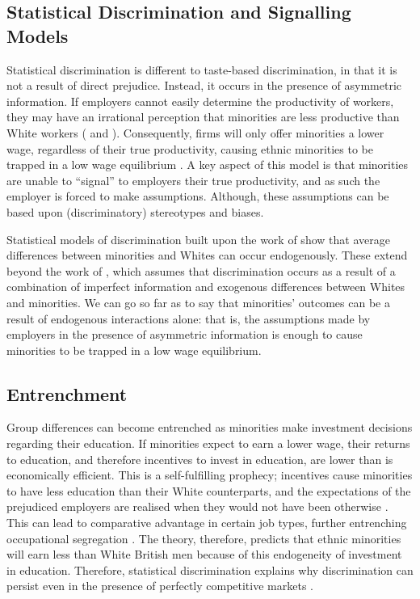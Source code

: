 \documentclass[class=article, crop=false]{standalone}
\begin{document}
\subsection{Statistical Discrimination and Signalling Models}
\label{sec:Stat_discrim and signalling}
Statistical discrimination is different to taste-based discrimination, in that it is not a result of direct prejudice. Instead, it occurs in the presence of asymmetric information. If employers cannot easily determine the productivity of workers, they may have an irrational perception that minorities are less productive than White workers (\citet{Phelps} and \citet{LundbergB}). Consequently, firms will only offer minorities a lower wage, regardless of their true productivity, causing ethnic minorities to be trapped in a low wage equilibrium \citep{Barr}. A key aspect of this model is that minorities are unable to \enquote{signal} to employers their true productivity, and as such the employer is forced to make assumptions. Although, these assumptions can be based upon (discriminatory) stereotypes and biases.

Statistical models of discrimination built upon the work of \citep{Arrow} show that average differences between minorities and Whites can occur endogenously. These extend beyond the work of \citet{Phelps}, which assumes that discrimination occurs as a result of a combination of imperfect information and exogenous differences between Whites and minorities. We can go so far as to say that minorities' outcomes can be a result of endogenous interactions alone: that is, the assumptions made by employers in the presence of asymmetric information is enough to cause minorities to be trapped in a low wage equilibrium. 

\subsection{Entrenchment}
Group differences can become entrenched as minorities make investment decisions regarding their education. If minorities expect to earn a lower wage, their returns to education, and therefore incentives to invest in education, are lower than is economically efficient. This is a self-fulfilling prophecy; incentives cause minorities to have less education than their White counterparts, and the expectations of the prejudiced employers are realised when they would not have been otherwise \citep{Hanming}. This can lead to comparative advantage in certain job types, further entrenching occupational segregation \citep{Altonji}. The theory, therefore, predicts that ethnic minorities will earn less than White British men because of this endogeneity of investment in education. Therefore, statistical discrimination explains why discrimination can persist even in the presence of perfectly competitive markets \citep{LundbergB}.
\end{document}
